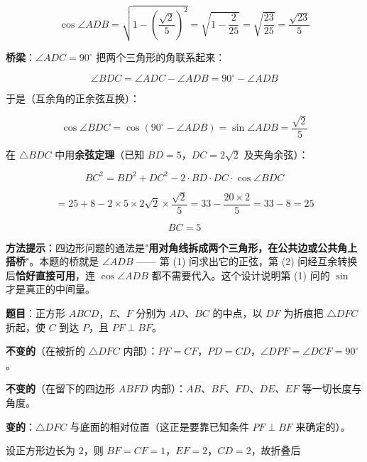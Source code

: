 \[\cos\angle ADB=\sqrt{1-\left(\frac{\sqrt2}5\right)^{2}}=\sqrt{1-\frac2{25}}=\sqrt{\frac{23}{25}}=\frac{\sqrt{23}}5\]


\textbf{桥梁}：$\angle ADC=90^\circ$ 把两个三角形的角联系起来：

\[\angle BDC=\angle ADC-\angle ADB=90^\circ-\angle ADB\]

于是（互余角的正余弦互换）：

\[\cos\angle BDC=\cos\left(90^\circ-\angle ADB\right)=\sin\angle ADB=\frac{\sqrt2}5\]

在 $\triangle BDC$ 中用\textbf{余弦定理}（已知 $BD=5$，$DC=2\sqrt2$ 及夹角余弦）：

\[BC^{2}=BD^{2}+DC^{2}-2\cdot BD\cdot DC\cdot\cos\angle BDC\]

\[=25+8-2\times5\times2\sqrt2\times\frac{\sqrt2}5=33-\frac{20\times2}5=33-8=25\]

\[BC=5\]


\begin{gktip}
\textbf{方法提示}：四边形问题的通法是"\textbf{用对角线拆成两个三角形，在公共边或公共角上搭桥}"。本题的桥就是 $\angle ADB$ —— 第 (1) 问求出它的正弦，第 (2) 问经互余转换后\textbf{恰好直接可用}，连 $\cos\angle ADB$ 都不需要代入。这个设计说明第 (1) 问的 $\sin$ 才是真正的中间量。
\end{gktip}

\par\medskip


\textbf{题目}：正方形 $ABCD$，$E$、$F$ 分别为 $AD$、$BC$ 的中点，以 $DF$ 为折痕把 $\triangle DFC$ 折起，使 $C$ 到达 $P$，且 $PF\perp BF$。

\begin{center}\end{center}


\textbf{不变的}（在被折的 $\triangle DFC$ 内部）：$PF=CF$，$PD=CD$，$\angle DPF=\angle DCF=90^\circ$。

\textbf{不变的}（在留下的四边形 $ABFD$ 内部）：$AB$、$BF$、$FD$、$DE$、$EF$ 等一切长度与角度。

\textbf{变的}：$\triangle DFC$ 与底面的相对位置（这正是要靠已知条件 $PF\perp BF$ 来确定的）。

设正方形边长为 $2$，则 $BF=CF=1$，$EF=2$，$CD=2$，故折叠后

